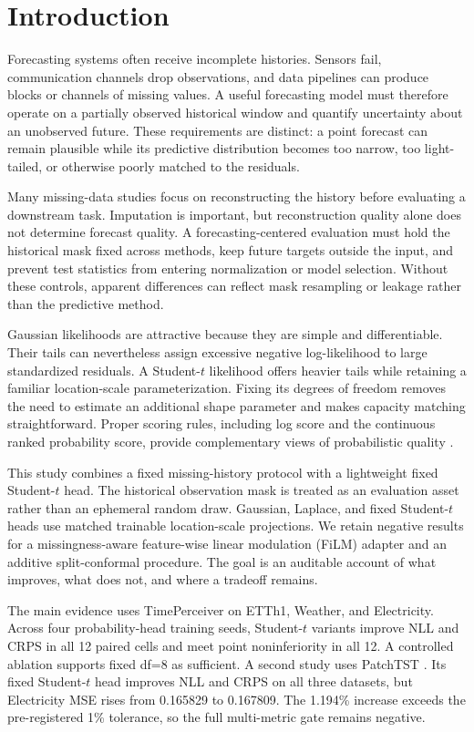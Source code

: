\section{Introduction}
\label{sec:introduction}

Forecasting systems often receive incomplete histories. Sensors fail, communication channels drop observations, and data pipelines can produce blocks or channels of missing values. A useful forecasting model must therefore operate on a partially observed historical window and quantify uncertainty about an unobserved future. These requirements are distinct: a point forecast can remain plausible while its predictive distribution becomes too narrow, too light-tailed, or otherwise poorly matched to the residuals.

Many missing-data studies focus on reconstructing the history before evaluating a downstream task. Imputation is important, but reconstruction quality alone does not determine forecast quality. A forecasting-centered evaluation must hold the historical mask fixed across methods, keep future targets outside the input, and prevent test statistics from entering normalization or model selection. Without these controls, apparent differences can reflect mask resampling or leakage rather than the predictive method.

Gaussian likelihoods are attractive because they are simple and differentiable. Their tails can nevertheless assign excessive negative log-likelihood to large standardized residuals. A Student-$t$ likelihood offers heavier tails while retaining a familiar location-scale parameterization. Fixing its degrees of freedom removes the need to estimate an additional shape parameter and makes capacity matching straightforward. Proper scoring rules, including log score and the continuous ranked probability score, provide complementary views of probabilistic quality \cite{gneiting2007proper}.

This study combines a fixed missing-history protocol with a lightweight fixed Student-$t$ head. The historical observation mask is treated as an evaluation asset rather than an ephemeral random draw. Gaussian, Laplace, and fixed Student-$t$ heads use matched trainable location-scale projections. We retain negative results for a missingness-aware feature-wise linear modulation (FiLM) adapter and an additive split-conformal procedure. The goal is an auditable account of what improves, what does not, and where a tradeoff remains.

The main evidence uses TimePerceiver \cite{lee2025timeperceiver} on ETTh1, Weather, and Electricity. Across four probability-head training seeds, Student-$t$ variants improve NLL and CRPS in all 12 paired cells and meet point noninferiority in all 12. A controlled ablation supports fixed df=8 as sufficient. A second study uses PatchTST \cite{nie2023patchtst}. Its fixed Student-$t$ head improves NLL and CRPS on all three datasets, but Electricity MSE rises from 0.165829 to 0.167809. The 1.194\% increase exceeds the pre-registered 1\% tolerance, so the full multi-metric gate remains negative.

